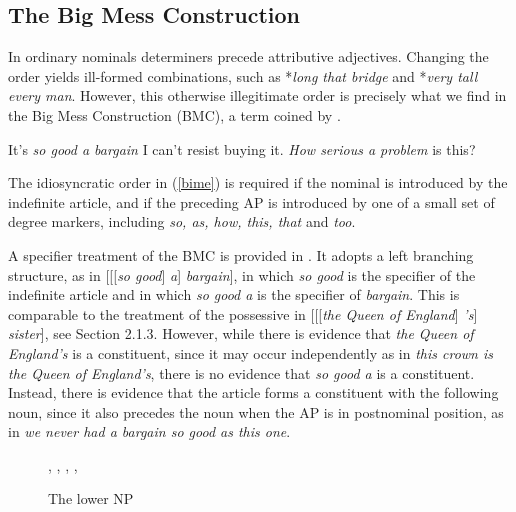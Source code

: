 \documentclass[output=paper]{langsci/langscibook}
\begin{document}
\subsection{The Big Mess Construction} 


In ordinary nominals determiners precede attributive adjectives. Changing the order 
yields ill-formed combinations, such as *\emph{long that bridge} and *\emph{very tall every man}. 
However, this otherwise illegitimate order is precisely what we find in 
the Big Mess Construction (BMC), a term coined by \citet{Berman74}.  

\begin{exe}
\ex\label{bime}
\begin{xlist}
\ex   It's \emph{so good a bargain} I can't resist buying it.
\ex   \emph{How serious a problem} is this?
\end{xlist}
\end{exe} 

\noindent
The idiosyncratic order in (\ref{bime}) is required if the nominal is introduced 
by the indefinite article, and if the preceding AP is introduced by one of a small 
set of degree markers, including \emph{so, as, how, this, that} and \emph{too}. 

A specifier treatment of the BMC is provided in \citet[201]{GS00}. It adopts  
a left branching structure, as in  [[[\emph{so good}] \emph{a}] \emph{bargain}], 
in which \emph{so good} is the specifier of the indefinite article and in which 
\emph{so good a} is the specifier of \emph{bargain}. This is comparable to the 
treatment of the possessive in [[[\emph{the Queen of England}] \emph{'s}] \emph{sister}],
see Section 2.1.3.  
However, while there is evidence that \emph{the Queen of England's} is a constituent,
since it may occur independently as in \emph{this crown is the Queen of England's}, there is 
no evidence that \emph{so good a} is a constituent. Instead, there is evidence that 
the article forms a constituent with the following noun, since it also precedes the noun 
when the AP is in postnominal position, as in \emph{we never had a bargain so good as this one}.

\begin{figure}
\begin{center}
\tree
{,    
  {,    
    {}},
  {,
    {}}}
\caption{\label{aprob} The lower NP }
\end{center}
\end{figure}
\end{document}
